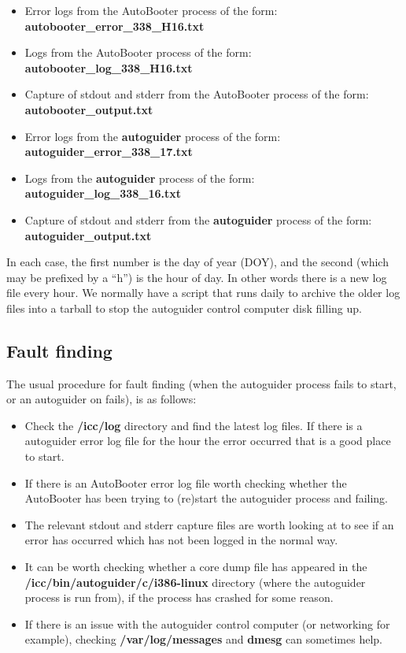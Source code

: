 \documentclass[10pt,a4paper]{article}
\begin{document}
\begin{itemize}
\item Error logs from the AutoBooter process of the form: {\bf autobooter\_error\_338\_H16.txt}
\item Logs from the AutoBooter process of the form: {\bf autobooter\_log\_338\_H16.txt}
\item Capture of stdout and stderr from the AutoBooter process of the form: {\bf autobooter\_output.txt}
\item Error logs from the {\bf autoguider} process of the form: {\bf autoguider\_error\_338\_17.txt}
\item Logs from the {\bf autoguider} process of the form: {\bf autoguider\_log\_338\_16.txt}
\item Capture of stdout and stderr from the {\bf autoguider} process of the form: {\bf autoguider\_output.txt}
\end{itemize}

In each case, the first number is the day of year (DOY), and the second (which may be prefixed by a ``h'') is the hour of day. In other words there is a new log file every hour. We normally have a script that runs daily to archive the older log files into a tarball to stop the autoguider control computer disk filling up.

\subsection{Fault finding}

The usual procedure for fault finding (when the autoguider process fails to start, or an autoguider on fails), is as follows:

\begin{itemize}
\item Check the {\bf /icc/log} directory and find the latest log files. If there is a autoguider error log file for the
hour the error occurred that is a good place to start.
\item If there is  an AutoBooter error log file worth checking whether the AutoBooter has been trying to (re)start the autoguider process and failing.
\item The relevant stdout and stderr capture files are worth looking at to see if an error has occurred which has not been logged in the normal way.
\item It can be worth checking whether a core dump file has appeared  in the {\bf /icc/bin/autoguider/c/i386-linux} directory (where the autoguider process is run from), if the process has crashed for some reason.
\item If there is an issue with the autoguider control computer (or networking for example), checking {\bf /var/log/messages} and {\bf dmesg} can sometimes help.
\end{itemize}
\end{document}
